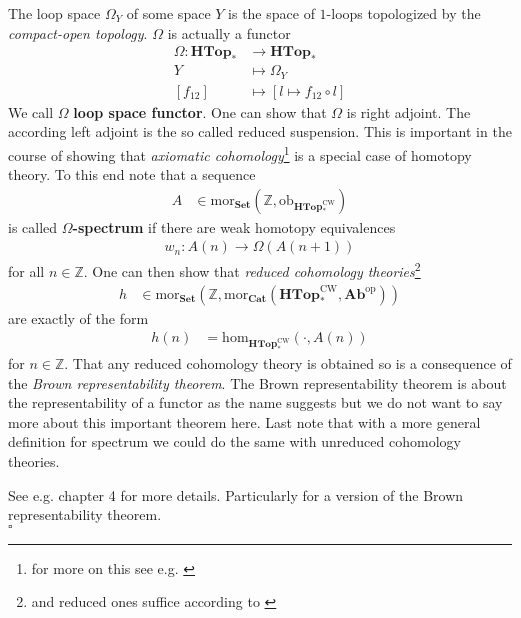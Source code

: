 \begin{exa}
\label{exa:loopradjoint}
The loop space $\Omega_{Y}$ of some space $Y$ is the space of $1$-loops topologized by the \textit{compact-open topology}. $\Omega$ is actually a functor
\begin{align*}
  \Omega
  \colon
  \mathbf{HTop}_{\ast}
  &\rightarrow
  \mathbf{HTop}_{\ast}
  \\
  Y
  &\mapsto
  \Omega_{Y}
  \\
  [f_{12}]
  &\mapsto
  \left[
    l
    \mapsto
    f_{12}
    \circ
    l
  \right]
\end{align*}
We call $\Omega$ \textbf{loop space functor}. One can show that $\Omega$ is right adjoint. The according left adjoint is the so called reduced suspension. This is important in the course of showing that \textit{axiomatic cohomology}\footnote{for more on this see e.g. \cite{00000011}} is a special case of homotopy theory. To this end note that a sequence
\begin{align*}
  A
  &\in
  \mathrm{mor}_{\mathbf{Set}}
  \left(
    \mathbb{Z},
    \mathrm{ob}_{\mathbf{HTop}_{\ast}^{\textrm{CW}}}
  \right)
\end{align*}
is called \textbf{$\Omega$-spectrum} if there are weak homotopy equivalences
\begin{align*}
  w_{n}
  \colon
  A(n)
  \rightarrow
  \Omega(A(n+1))
\end{align*}
for all $n \in \mathbb{Z}$. One can then show that \textit{reduced cohomology theories}\footnote{and reduced ones suffice according to \cite{8b5861fc}}
\begin{align*}
  h
  &\in
  \mathrm{mor}_{\mathbf{Set}}
  \left(
    \mathbb{Z},
    \mathrm{mor}_{\mathbf{Cat}}
    \left(
      \mathbf{HTop}_{\ast}^{\textrm{CW}},
      \mathbf{Ab}^{\textrm{op}}
    \right)
  \right)
\end{align*}
are exactly of the form
\begin{align*}
  h(n)
  &=
  \mathrm{hom}_{\mathbf{HTop}_{\ast}^{\textrm{CW}}}(\cdot,A(n))
\end{align*}
for $n \in \mathbb{Z}$. That any reduced cohomology theory is obtained so is a consequence of the \textit{Brown representability theorem}. The Brown representability theorem is about the representability of a functor as the name suggests but we do not want to say more about this important theorem here. Last note that with a more general definition for spectrum we could do the same with unreduced cohomology theories.
\end{exa}
\begin{prf}
See e.g. \cite{8b5861fc} chapter 4 for more details. Particularly for a version of the Brown representability theorem.
\\
\phantom{proven}
\hfill
$\square$
\end{prf}
